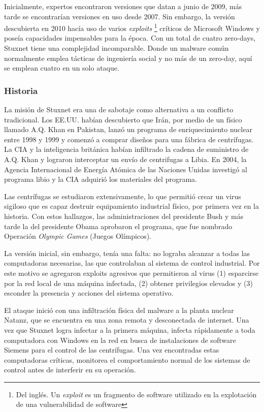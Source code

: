 \documentclass{article}
\begin{document}
Inicialmente, expertos encontraron versiones que datan a junio de 2009, más tarde se encontrarían versiones en uso desde 2007. Sin embargo, la versión descubierta en 2010 hacía uso de varios {\it exploits} \footnote{Del inglés. Un {\it exploit} es un fragmento de software utilizado en la explotación de una vulnerabilidad de software} críticos de Microsoft Windows y poseía capacidades impensables para la época. Con un total de cuatro zero-days, Stuxnet tiene una complejidad incomparable. Donde un malware común normalmente emplea tácticas de ingeniería social y no más de un zero-day, aquí se emplean cuatro en un solo ataque. \autocite{symantec-stuxnet} \autocite{reuters-stuxnet}

\subsubsection{Historia}
La misión de Stuxnet era una de sabotaje como alternativa a un conflicto tradicional. Los EE.UU. habían descubierto que Irán, por medio de un físico llamado A.Q. Khan en Pakistan, lanzó un programa de enriquecimiento nuclear entre 1998 y 1999 y comenzó a comprar diseños para una fábrica de centrífugas. La CIA y la inteligencia británica habían infiltrado la cadena de suministro de A.Q. Khan y lograron interceptar un envío de centrifugas a Libia. En 2004, la Agencia Internacional de Energía Atómica de las Naciones Unidas investigó al programa libio y la CIA adquirió los materiales del programa.

Las centrífugas se estudiaron extensivamente, lo que permitió crear un virus sigiloso que es capaz destruir equipamiento industrial físico, por primera vez en la historia. Con estos hallazgos, las administraciones del presidente Bush y más tarde la del presidente Obama aprobaron el programa, que fue nombrado Operación {\it Olympic Games} (Juegos Olímpicos).

La versión inicial, sin embargo, tenía una falta: no lograba alcanzar a todas las computadoras necesarias, las que controlaban al sistema de control industrial. Por este motivo se agregaron exploits agresivos que permitieron al virus (1) esparcirse por la red local de una máquina infectada, (2) obtener privilegios elevados y (3) esconder la presencia y acciones del sistema operativo. 

El ataque inició con una infiltración física del malware a la planta nuclear Natanz, que se encuentra en una zona remota y desconectada de internet. Una vez que Stuxnet logra infectar a la primera máquina, infecta rápidamente a toda computadora con Windows en la red en busca de instalaciones de software Siemens para el control de las centrífugas. Una vez encontradas estas computadoras críticas, monitorea el comportamiento normal de los sistemas de control antes de interferir en su operación.
\end{document}

